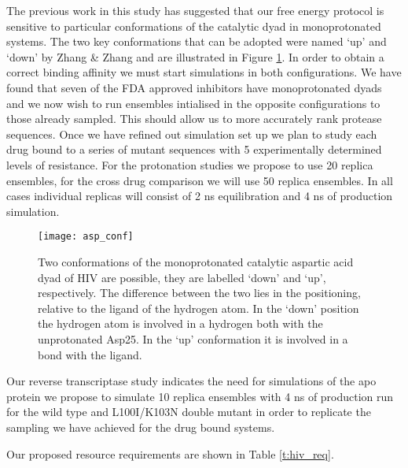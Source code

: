 \documentclass[a4paper,12pt]{article}
\begin{document}
The previous work in this study has suggested that our free energy protocol is sensitive to particular 
conformations of the catalytic dyad in monoprotonated systems. The two key conformations that can be 
adopted were named `up' and `down' by Zhang \& Zhang \cite{Zhang} and are illustrated in 
Figure \ref{fig:asp_conf}. In order to obtain a correct binding affinity we must start simulations in 
both configurations. We have found that seven of the FDA approved inhibitors have monoprotonated 
dyads and we now wish to run ensembles intialised in the opposite configurations to those already sampled.
This should allow us to more accurately rank protease sequences. Once we have refined out simulation set up
we plan to study each drug bound to a series of mutant sequences with 5 experimentally determined levels 
of resistance. For the protonation studies we propose to use 20 replica ensembles, for the cross drug comparison
we will use 50 replica ensembles. In all cases individual replicas will consist of 2 ns equilibration and 4 
ns of production simulation.

\begin{figure}
  \begin{center}
    \texttt{[image: asp\_conf]}
    \caption{Two conformations of the monoprotonated catalytic aspartic acid dyad of HIV are possible, they are labelled `down' and `up', respectively. The difference between the two lies in the positioning, relative to the ligand of the hydrogen atom. In the `down' position the hydrogen atom is involved in a hydrogen both with the unprotonated Asp25. In the `up' conformation it is involved in a bond with the ligand.}
    \label{fig:asp_conf} 
  \end{center}
\end{figure}

Our reverse transcriptase study indicates the need for simulations of the apo protein we propose to simulate 
10 replica ensembles with 4 ns of production run for the wild type and L100I/K103N double mutant in order to 
replicate the sampling we have achieved for the drug bound systems. 

Our proposed resource requirements are shown in Table \ref{t:hiv_req}.
\end{document}
